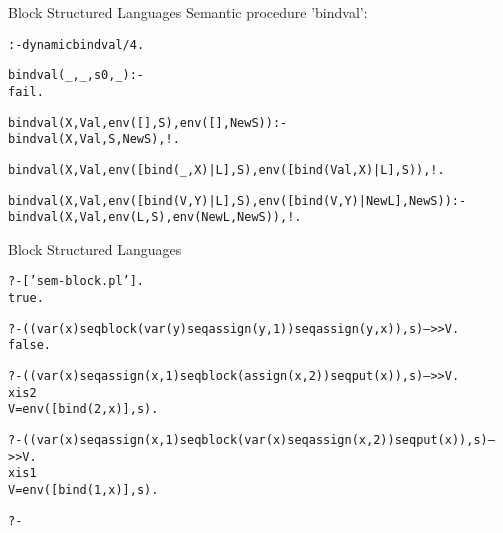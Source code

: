 \documentclass{beamer}
\begin{document}
\begin{frame}[fragile]{Block Structured Languages}
Semantic procedure 'bindval':
\begin{alltt}\scriptsize
% the predicate 'bindval(+Variable,+Value,+State,-FinalState)' updates
% a binding term in the state.  this update is done "in place"
% in order to support global variables.  the predicate has to
% search both the binding list and the stack of binding
% lists.
:- dynamic bindval/4.                   % modifiable predicate

bindval(_,_,s0,_) :- 
    fail.

bindval(X,Val,env([],S),env([],NewS)) :-
    bindval(X,Val,S,NewS),!.

bindval(X,Val,env([bind(_,X)|L],S),env([bind(Val,X)|L],S)),!.

bindval(X,Val,env([bind(V,Y)|L],S),env([bind(V,Y)|NewL],NewS)) :-
    bindval(X,Val,env(L,S),env(NewL,NewS)),!.
\end{alltt}
\end{frame}

\begin{frame}[fragile]{Block Structured Languages}
\begin{alltt}\tiny
?- ['sem-block.pl'].
%   xis.pl compiled 0.00 sec, 7,792 bytes
%  preamble.pl compiled 0.00 sec, 8,956 bytes
%  xis.pl compiled 0.00 sec, 148 bytes
% sem-block.pl compiled 0.00 sec, 18,192 bytes
true.

?- ((var(x) seq block( var(y) seq assign(y,1) ) seq assign(y,x)),s) -->> V. 
false.

?- ((var(x) seq assign(x,1) seq block( assign(x,2) ) seq put(x)),s) -->> V.
x is 2
V = env([bind(2, x)], s).

?- (( var(x) seq assign(x,1) seq block( var(x) seq assign(x,2) ) seq put(x)),s) -->> V. 
x is 1
V = env([bind(1, x)], s).

?- 
\end{alltt}
\end{frame}
\end{document}
